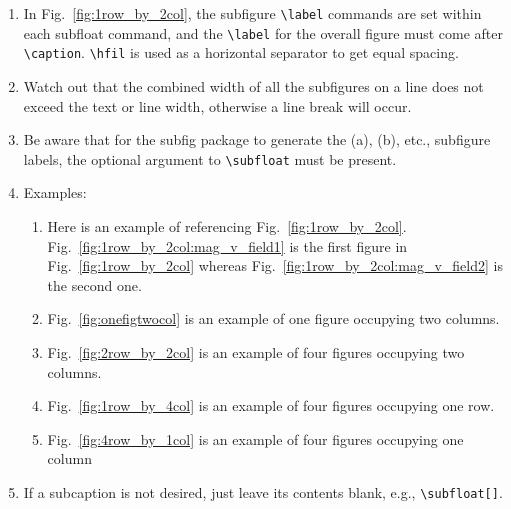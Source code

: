 \begin{enumerate}
	\item In Fig.~\ref{fig:1row_by_2col}, the subfigure \verb|\label| commands are set within each subfloat command, and the \verb|\label| for the overall figure must come after \verb|\caption|. \verb|\hfil| is used as a horizontal separator to get equal spacing. 
	
	\item Watch out that the combined width of all the subfigures on a line does not exceed the text or line width, otherwise a line break will occur.
	
 \item Be aware that for the subfig package to generate the (a), (b), etc., subfigure labels, the optional argument to \verb|\subfloat| must be present. 

	\item Examples:

	\begin{enumerate}
		\item Here is an example of referencing Fig.~\ref{fig:1row_by_2col}. Fig.~\ref{fig:1row_by_2col:mag_v_field1} is the first figure in Fig.~\ref{fig:1row_by_2col} whereas Fig.~\ref{fig:1row_by_2col:mag_v_field2} is the second one.
		
		\item Fig.~\ref{fig:onefigtwocol} is an example of one figure occupying two columns. 
		
		\item Fig.~\ref{fig:2row_by_2col} is an example of four figures occupying two columns.
		
		\item Fig.~\ref{fig:1row_by_4col} is an example of four figures occupying one row.
		
		\item Fig.~\ref{fig:4row_by_1col} is an example of four figures occupying one column
				
	\end{enumerate}
	
	\item If a subcaption is not desired, just leave its contents blank, e.g., \verb|\subfloat[]|.

\end{enumerate}


\begin{figure*}[!tb]
	\centering
	\hfil
	\caption{Example of two figures in two columns.}
	\label{fig:1row_by_2col}
\end{figure*}


